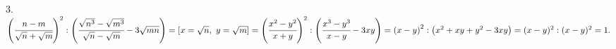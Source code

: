 3. $\left(\cfrac{n-m}{\sqrt{n}+\sqrt{m}}\right)^2:\left(\cfrac{\sqrt{n^3}-\sqrt{m^3}}{\sqrt{n}-\sqrt{m}}-3\sqrt{mn}\right)=
[x=\sqrt{n},\ y=\sqrt{m}]=\left(\cfrac{x^2-y^2}{x+y}\right)^2:\left(\cfrac{x^3-y^3}{x-y}-3xy\right)=
\left(x-y\right)^2:\left(x^2+xy+y^2-3xy\right)=(x-y)^2:(x-y)^2=1.$\\
